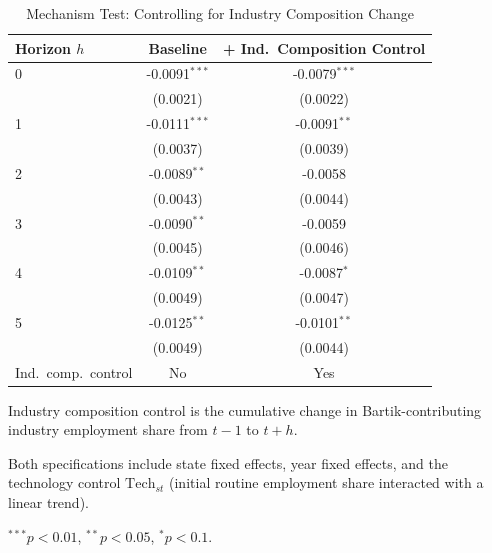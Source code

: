 \begin{table}[htbp]
\centering
\caption{Mechanism Test: Controlling for Industry Composition Change}
\label{tab:mechanism}
\begin{tabular}{lcc}
\hline\hline
Horizon $h$ & Baseline & + Ind.\ Composition Control \\
\hline
0 & -0.0091$^{***}$ & -0.0079$^{***}$ \\
 & (0.0021) & (0.0022) \\[3pt]
1 & -0.0111$^{***}$ & -0.0091$^{**}$ \\
 & (0.0037) & (0.0039) \\[3pt]
2 & -0.0089$^{**}$ & -0.0058 \\
 & (0.0043) & (0.0044) \\[3pt]
3 & -0.0090$^{**}$ & -0.0059 \\
 & (0.0045) & (0.0046) \\[3pt]
4 & -0.0109$^{**}$ & -0.0087$^{*}$ \\
 & (0.0049) & (0.0047) \\[3pt]
5 & -0.0125$^{**}$ & -0.0101$^{**}$ \\
 & (0.0049) & (0.0044) \\[3pt]
\hline
Ind.\ comp.\ control & No & Yes \\
\hline\hline
\end{tabular}
\begin{tablenotes}\small
\item Industry composition control is the cumulative change in Bartik-contributing
industry employment share from $t-1$ to $t+h$.
\item Both specifications include state fixed effects, year fixed effects, and the technology control $\text{Tech}_{st}$ (initial routine employment share interacted with a linear trend).
\item $^{***}p<0.01$, $^{**}p<0.05$, $^{*}p<0.1$.
\end{tablenotes}
\end{table}